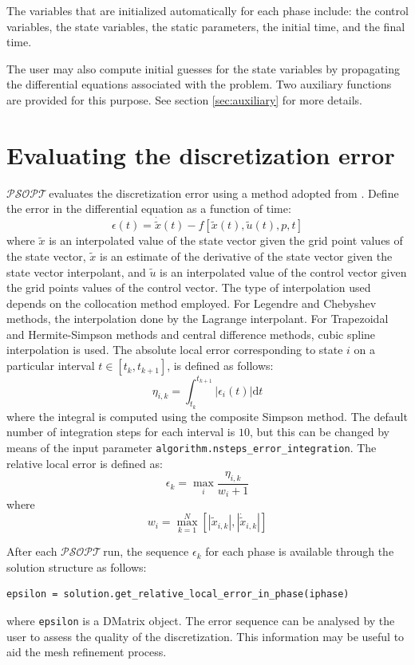 \documentclass[a4paper,11pt]{report}    %
\newcommand{\psopt}{$\mathcal{PSOPT}$\,}  %
\begin{document}
The variables that are initialized automatically for each phase  include: the control variables, the state variables, the
static parameters, the initial time, and the final time.

The user may also compute initial guesses for the state variables by propagating the differential equations
associated with the problem. Two auxiliary functions are provided for this purpose. See section \ref{sec:auxiliary} for more details.


\section{Evaluating the discretization error}

 \label{discretization_error}  

\psopt evaluates the discretization error using a method adopted from \cite{Betts:01}. Define the error
in the differential equation as a function of time:
\[
   \epsilon(t) = \dot{\tilde{x}}(t) - f[ \tilde{x}(t), \tilde{u}(t), p, t ] 
\]
where $\tilde{x}$ is an interpolated value of the state vector given the grid point values of 
the state vector, $\tilde{x}$ is an estimate of the derivative of the state  vector given the state
vector interpolant, and $\tilde{u}$ is an interpolated value of the control vector given the grid points
values of the control vector. The type of interpolation used depends on the collocation method employed.
For Legendre and Chebyshev methods, the interpolation done by the Lagrange interpolant. For
Trapezoidal and Hermite-Simpson methods and central difference methods, cubic spline
interpolation is used. The absolute local error corresponding to state $i$ on a particular interval
$t \in [t_k, t_{k+1}]$, is defined as follows:
\[
  \eta_{i,k} = \int_{t_k}^{t_{k+1}} | \epsilon_i(t) | \mathrm{d} t
\]
where the integral is computed using the composite Simpson method. The default number of integration steps for each interval
is $10$, but this can be changed by means of the input parameter \verb|algorithm.nsteps_error_integration|.
The relative local error is defined as:
\[
 \epsilon_k = \max_i \frac{\eta_{i,k}}{w_i + 1}
\]
where 
\[
   w_i = \max_{k=1}^N \left[ |\tilde{x}_{i,k}|, | \dot {\tilde{x}}_{i,k} | \right]
\]

After each \psopt run, the sequence $\epsilon_k$ for each phase is available through the solution structure as follows:
\begin{verbatim}
epsilon = solution.get_relative_local_error_in_phase(iphase)
\end{verbatim}
where \verb|epsilon| is a DMatrix object. The error sequence can be analysed by the user to assess the quality
of the discretization. This information may be useful to aid the mesh refinement process.
\end{document}
